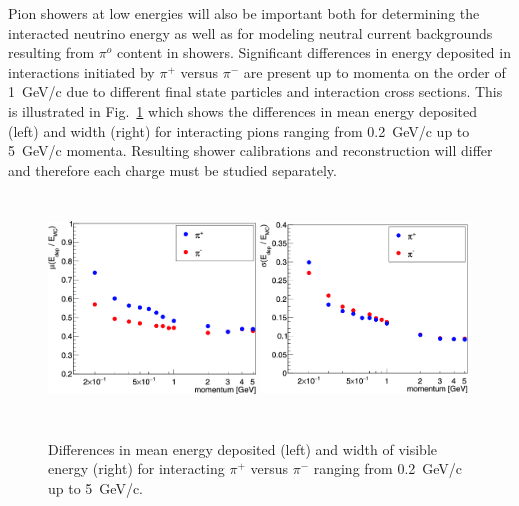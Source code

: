 Pion showers at low energies will also be important both for determining the interacted neutrino energy as well
as for modeling neutral current backgrounds resulting from $\pi^o$ content in showers. Significant
 differences in energy deposited in interactions initiated
by $\pi^+$ versus $\pi^-$  are present up to momenta on the order of 1~GeV/c due to different
final state particles and interaction cross sections. This is illustrated in 
Fig.~\ref{fig:pionshwr} which shows the differences in mean energy deposited (left) and width (right) 
for interacting pions ranging from 0.2~GeV/c up to 5~GeV/c momenta.
Resulting shower calibrations and reconstruction will differ and therefore each charge must be 
studied separately.

\begin{figure}[h!]
  \centering
\includegraphics[width=0.49\textwidth,height=6.0cm]{figures/pipimean_ticks1}
\includegraphics[width=0.49\textwidth,height=6.0cm]{figures/pipisigma_ticks1}
  \caption{Differences in mean energy deposited (left) and width of visible energy (right) 
for interacting $\pi^+$ versus $\pi^-$ ranging from 0.2~GeV/c up to 5~GeV/c. 
}
\label{fig:pionshwr}
\end{figure}


